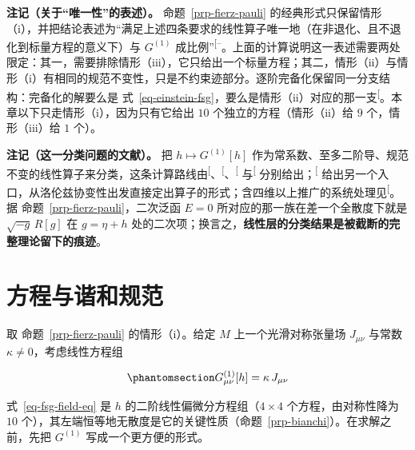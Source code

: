 \documentclass[
  chinese,
  a4paper,
  UTF8,
  12pt,
  oneside,
  openany]{ctexbook}
\theoremstyle{plain}
\theoremstyle{plain}
\theoremstyle{plain}
\theoremstyle{definition}
\theoremstyle{plain}
\theoremstyle{plain}
\theoremstyle{remark}
\begin{document}
\textbf{注记（关于``唯一性''的表述）。} 命题~\ref{prp-fierz-pauli}
的经典形式只保留情形（i），并把结论表述为``满足上述四条要求的线性算子唯一地（在非退化、且不退化到标量方程的意义下）与
\(G^{(1)}\)
成比例''\textsuperscript{{[}--\citeproc{ref-ortin2015}{15}{]}}。上面的计算说明这一表述需要两处限定：其一，需要排除情形（iii），它只给出一个标量方程；其二，情形（ii）与情形（i）有相同的规范不变性，只是不约束迹部分。逐阶完备化保留同一分支结构：完备化的解要么是
式~\ref{eq-einstein-fsg}，要么是情形（ii）对应的那一支\textsuperscript{{[}\citeproc{ref-barcelo2014}{16}{]}}。本章以下只走情形（i），因为只有它给出
\(10\) 个独立的方程（情形（ii）给 \(9\) 个，情形（iii）给 \(1\) 个）。

\textbf{注记（这一分类问题的文献）。} 把 \(h\mapsto G^{(1)}[h]\)
作为常系数、至多二阶导、规范不变的线性算子来分类，这条计算路线由\textsuperscript{{[}\citeproc{ref-rosen1940}{17}{]}}、\textsuperscript{{[}\citeproc{ref-gupta1954}{13}{]}}、\textsuperscript{{[}\citeproc{ref-kraichnan1955}{18}{]}}
与\textsuperscript{{[}\citeproc{ref-feynman1995}{19}{]}}
分别给出；\textsuperscript{{[}\citeproc{ref-weinberg1964}{14}{]}}
给出另一个入口，从洛伦兹协变性出发直接定出算子的形式；含四维以上推广的系统处理见\textsuperscript{{[}\citeproc{ref-ortin2015}{15}{]}}。据
命题~\ref{prp-fierz-pauli}，二次泛函 \(E=0\)
所对应的那一族在差一个全散度下就是 \(\sqrt{-g}\,R[g]\) 在 \(g=\eta+h\)
处的二次项；换言之，\textbf{线性层的分类结果是被截断的完整理论留下的痕迹}。

\section{方程与谐和规范}\label{sec-fsg-harmonic}

取 命题~\ref{prp-fierz-pauli} 的情形（i）。给定 \(M\)
上一个光滑对称张量场 \(J_{\mu\nu}\) 与常数
\(\kappa\neq0\)，考虑线性方程组

\begin{equation}\protect\phantomsection\label{eq-fsg-field-eq}{
G^{(1)}_{\mu\nu}[h] = \kappa\,J_{\mu\nu}
}\end{equation}

式~\ref{eq-fsg-field-eq} 是 \(h\) 的二阶线性偏微分方程组（\(4\times4\)
个方程，由对称性降为 \(10\)
个），其左端恒等地无散度是它的关键性质（命题~\ref{prp-bianchi}）。在求解之前，先把
\(G^{(1)}\) 写成一个更方便的形式。
\end{document}

